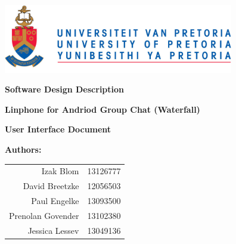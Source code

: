 \begin{titlepage}
\begin{flushright}

\includegraphics[width=380px]{images/University_of_Pretoria_Logo.png}
\newline
\newline

\textbf {\LARGE Software Design Description} \newline

\textbf {\Large Linphone for Andriod Group Chat (Waterfall)}\newline

\textbf {\large User Interface Document}\newline

\centering \textbf {\large Authors:}

\begin{table}[H]
\large
\centering
\begin{tabular}{rl}
	Izak Blom & 13126777 \\
	David Breetzke & 12056503 \\
	Paul Engelke & 13093500 \\
	Prenolan Govender & 13102380 \\
	Jessica Lessev & 13049136 \\
\end{tabular}
\end{table}

\end{flushright}
\end{titlepage}